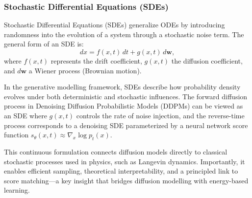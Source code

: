 \subsubsection{Stochastic Differential Equations (SDEs)}

Stochastic Differential Equations (SDEs) generalize ODEs by introducing randomness into the evolution of a system through a stochastic noise term. The general form of an SDE is:
\begin{equation}
    dx = f(x, t)\,dt + g(x, t)\,d\mathbf{w},
\end{equation}
where \( f(x, t) \) represents the drift coefficient, \( g(x, t) \) the diffusion coefficient, and \( d\mathbf{w} \) a Wiener process (Brownian motion).  

In the generative modelling framework, SDEs describe how probability density evolves under both deterministic and stochastic influences. The forward diffusion process in Denoising Diffusion Probabilistic Models (DDPMs) can be viewed as an SDE where \( g(x, t) \) controls the rate of noise injection, and the reverse-time process corresponds to a denoising SDE parameterized by a neural network score function \( s_\theta(x, t) \approx \nabla_x \log p_t(x) \).  

This continuous formulation connects diffusion models directly to classical stochastic processes used in physics, such as Langevin dynamics. Importantly, it enables efficient sampling, theoretical interpretability, and a principled link to score matching—a key insight that bridges diffusion modelling with energy-based learning.
